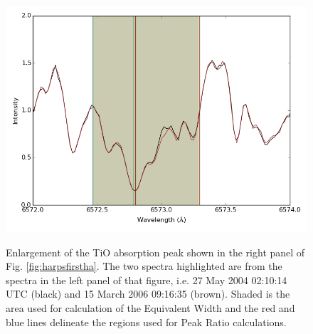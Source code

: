 \begin{figure}[!htbp]
\begin{center}
\includegraphics[scale=0.25]{Figures/tipeak.png} \\
\end{center}   
\caption{Enlargement of the TiO absorption peak shown in the right panel of Fig. \ref{fig:harpsfirstha}. The two spectra
highlighted are from the spectra in the left panel of that figure, i.e. 27 May 2004 02:10:14 UTC (black) and 15 March
2006 09:16:35 (brown). Shaded is the area used for calculation of the Equivalent Width and the red and blue lines
delineate the regions used for Peak Ratio calculations.}
 \protect\label{fig:tiopeak}
\end{figure}


